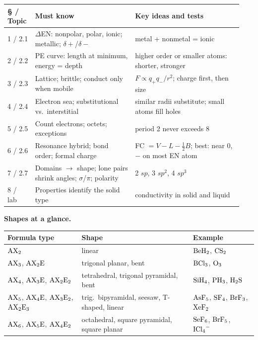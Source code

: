 \documentclass[11pt]{article}
\begin{document}
\begin{longtable}{@{}p{0.11\linewidth}p{0.40\linewidth}p{0.43\linewidth}@{}}\toprule
\S{} / Topic & Must know & Key ideas and tests \\ \midrule
1 / 2.1 & $\Delta$EN: nonpolar, polar, ionic; metallic; $\delta+$/$\delta-$ & metal + nonmetal = ionic \\[3pt]
2 / 2.2 & PE curve: length at minimum, energy = depth & higher order or smaller atoms: shorter, stronger \\[3pt]
3 / 2.3 & Lattice; brittle; conduct only when mobile & $F \propto q_+q_-/r^2$; charge first, then size \\[3pt]
4 / 2.4 & Electron sea; substitutional vs.\ interstitial & similar radii substitute; small atoms fill holes \\[3pt]
5 / 2.5 & Count electrons; octets; exceptions & period 2 never exceeds 8 \\[3pt]
6 / 2.6 & Resonance hybrid; bond order; formal charge & FC $= V - L - \tfrac12 B$; best: near 0, $-$ on most EN atom \\[3pt]
7 / 2.7 & Domains $\rightarrow$ shape; lone pairs shrink angles; $\sigma$/$\pi$; polarity & 2 $sp$, 3 $sp^2$, 4 $sp^3$ \\[3pt]
8 / lab & Properties identify the solid type & conductivity in solid and liquid \\ \bottomrule
\end{longtable}

\textbf{Shapes at a glance.}
\begin{center}
\begin{tabular}{lll}\toprule
Formula type & Shape & Example \\ \midrule
$\ce{AX2}$ & linear & $\ce{BeH2}$, $\ce{CS2}$ \\
$\ce{AX3}$, $\ce{AX2E}$ & trigonal planar, bent & $\ce{BCl3}$, $\ce{O3}$ \\
$\ce{AX4}$, $\ce{AX3E}$, $\ce{AX2E2}$ & tetrahedral, trigonal pyramidal, bent & $\ce{SiH4}$, $\ce{PH3}$, $\ce{H2S}$ \\
$\ce{AX5}$, $\ce{AX4E}$, $\ce{AX3E2}$, $\ce{AX2E3}$ & trig.\ bipyramidal, seesaw, T-shaped, linear & $\ce{AsF5}$, $\ce{SF4}$, $\ce{BrF3}$, $\ce{XeF2}$ \\
$\ce{AX6}$, $\ce{AX5E}$, $\ce{AX4E2}$ & octahedral, square pyramidal, square planar & $\ce{SeF6}$, $\ce{BrF5}$, $\ce{ICl4-}$ \\ \bottomrule
\end{tabular}
\end{center}
\end{document}
